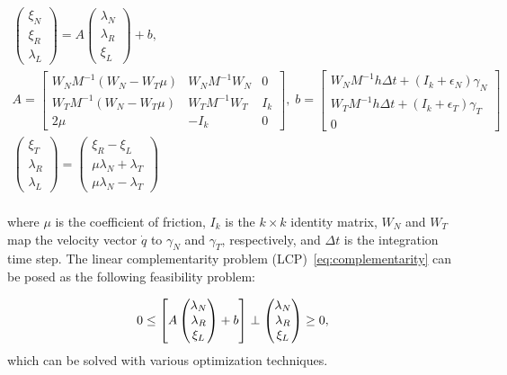 \begin{gather*}
  \begin{pmatrix}
    \xi_N \\
    \xi_R \\
    \lambda_L
  \end{pmatrix} =
      A
    \begin{pmatrix}
      \lambda_N \\
      \lambda_R \\
      \xi_L
    \end{pmatrix} + b, \\
    A = \begin{bmatrix}
      W_N M^{-1} (W_N - W_T \mu) & W_N M^{-1} W_N & 0  \\
      W_T M^{-1} (W_N - W_T \mu) & W_T M^{-1} W_T & I_k  \\
      2\mu & -I_k & 0
    \end{bmatrix}, \;  b = \begin{bmatrix}
      W_N M^{-1} h \Delta t + (I_k+\epsilon_N) \gamma_N\\
      W_T M^{-1} h \Delta t + (I_k+\epsilon_T) \gamma_T\\
      0
    \end{bmatrix} \\
    \begin{pmatrix}
      \xi_T   \\
      \lambda_R \\
      \lambda_L 
    \end{pmatrix} = 
    \begin{pmatrix}
      \xi_R - \xi_L \\
      \mu \lambda_N + \lambda_T  \\
      \mu \lambda_N - \lambda_T  
    \end{pmatrix} \\
\end{gather*}
 
\noindent where $\mu$ is the coefficient of friction, $I_k$ is the $k \times k$ identity
matrix, $W_N$ and $W_T$ map the velocity vector $\dot{q}$ to $\gamma_N$ and
$\gamma_T$, respectively, and $\Delta t$ is the integration time step.
%
The linear complementarity problem (LCP)~\eqref{eq:complementarity} can be posed as
the following feasibility problem:

\begin{equation}
    0 \leq 
    \left[ A \begin{pmatrix}
      \lambda_N \\
      \lambda_R \\
      \xi_L
    \end{pmatrix} + b \right]
    \perp
    \begin{pmatrix}
      \lambda_N \\
      \lambda_R \\
      \xi_L
    \end{pmatrix} \geq 0, \\
  \label{eq:feasibility} 
\end{equation}
\noindent which can be solved with various optimization techniques. 

